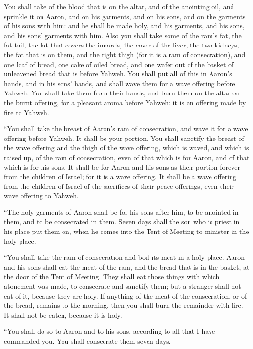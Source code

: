{You shall take of the blood that is on the altar, and of the anointing oil, and sprinkle it on Aaron, and on his garments, and on his sons, and on the garments of his sons with him: and he shall be made holy, and his garments, and his sons, and his sons’ garments with him.
Also you shall take some of the ram’s fat, the fat tail, the fat that covers the innards, the cover of the liver, the two kidneys, the fat that is on them, and the right thigh (for it is a ram of consecration),
and one loaf of bread, one cake of oiled bread, and one wafer out of the basket of unleavened bread that is before Yahweh.
You shall put all of this in Aaron’s hands, and in his sons’ hands, and shall wave them for a wave offering before Yahweh.
You shall take them from their hands, and burn them on the altar on the burnt offering, for a pleasant aroma before Yahweh: it is an offering made by fire to Yahweh.
\par }{\PP {}“You shall take the breast of Aaron’s ram of consecration, and wave it for a wave offering before Yahweh. It shall be your portion.
You shall sanctify the breast of the wave offering and the thigh of the wave offering, which is waved, and which is raised up, of the ram of consecration, even of that which is for Aaron, and of that which is for his sons.
It shall be for Aaron and his sons as their portion forever from the children of Israel; for it is a wave offering. It shall be a wave offering from the children of Israel of the sacrifices of their peace offerings, even their wave offering to Yahweh.
\par }{\PP {}“The holy garments of Aaron shall be for his sons after him, to be anointed in them, and to be consecrated in them.
Seven days shall the son who is priest in his place put them on, when he comes into the Tent of Meeting to minister in the holy place.
\par }{\PP {}“You shall take the ram of consecration and boil its meat in a holy place.
Aaron and his sons shall eat the meat of the ram, and the bread that is in the basket, at the door of the Tent of Meeting.
They shall eat those things with which atonement was made, to consecrate and sanctify them; but a stranger shall not eat of it, because they are holy.
If anything of the meat of the consecration, or of the bread, remains to the morning, then you shall burn the remainder with fire. It shall not be eaten, because it is holy.
\par }{\PP {}“You shall do so to Aaron and to his sons, according to all that I have commanded you. You shall consecrate them seven days.
}
